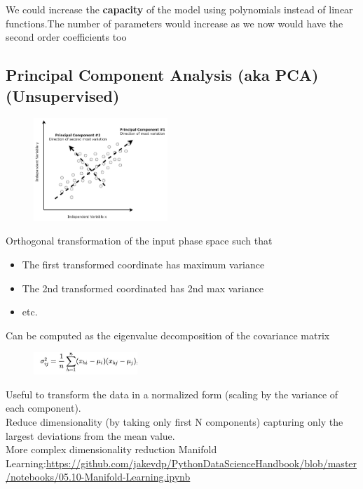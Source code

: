 We could increase the \textbf{capacity} of the model using polynomials instead of linear functions.The number of parameters would increase as we now would have the second order
coefficients too
\subsection{Principal Component Analysis (aka PCA) (Unsupervised)}

\begin{figure}
	\includegraphics[width=0.45\textwidth]{figure_ml/pca.png}
\end{figure} 

Orthogonal transformation of the input phase space such that
\begin{itemize}
	\item The first transformed coordinate has maximum variance 
	\item The 2nd transformed coordinated has 2nd max variance
	\item etc.
\end{itemize}

Can be computed as the eigenvalue decomposition of the
covariance matrix

\begin{figure}[ht]
	\includegraphics[width=0.35\textwidth]{figure_ml/pca_covariance.png}
\end{figure}
\FloatBarrier

Useful to transform the data in a normalized form (scaling by the variance of each component).\\
Reduce dimensionality (by taking only first N components) capturing only the largest deviations from the mean value.\\

More complex dimensionality reduction Manifold Learning:\url{https://github.com/jakevdp/PythonDataScienceHandbook/blob/master/notebooks/05.10-Manifold-Learning.ipynb}

